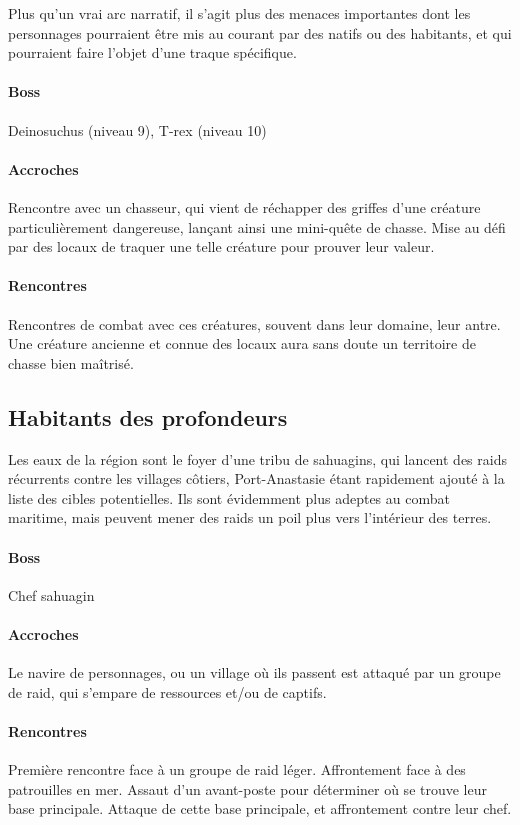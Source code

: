 \documentclass[10pt,a4paper]{book}
\begin{document}
Plus qu'un vrai arc narratif, il s'agit plus des menaces importantes dont les personnages pourraient être mis au courant par des natifs ou des habitants, et qui pourraient faire l'objet d'une traque spécifique.
\paragraph{Boss}Deinosuchus (niveau 9), T-rex (niveau 10)
\paragraph{Accroches}Rencontre avec un chasseur, qui vient de réchapper des griffes d'une créature particulièrement dangereuse, lançant ainsi une mini-quête de chasse. Mise au défi par des locaux de traquer une telle créature pour prouver leur valeur.
\paragraph{Rencontres}  Rencontres de combat avec ces créatures, souvent dans leur domaine, leur antre. Une créature ancienne et connue des locaux aura sans doute un territoire de chasse bien maîtrisé.
\subsection{Habitants des profondeurs}
Les eaux de la région sont le foyer d'une tribu de sahuagins, qui lancent des raids récurrents contre les villages côtiers, Port-Anastasie étant rapidement ajouté à la liste des cibles potentielles. Ils sont évidemment plus adeptes au combat maritime, mais peuvent mener des raids un poil plus vers l'intérieur des terres.
\paragraph{Boss}Chef sahuagin
\paragraph{Accroches}Le navire de personnages, ou un village où ils passent est attaqué par un groupe de raid, qui s'empare de ressources et/ou de captifs.
\paragraph{Rencontres}Première rencontre face à un groupe de raid léger. Affrontement face à des patrouilles en mer. Assaut d'un avant-poste pour déterminer où se trouve leur base principale. Attaque de cette base principale, et affrontement contre leur chef.
\end{document}
